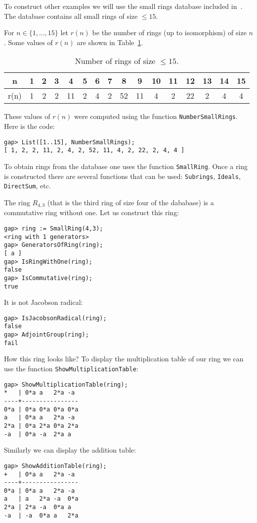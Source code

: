 To construct other examples we will use the small rings database included
in~\GAP.  The database contains all small rings of size $\leq15$.

\begin{example}
	For $n\in\{1,\dots,15\}$ let $r(n)$ be the number of rings (up to
	isomorphism) of size $n$. Some values of $r(n)$ are shown in
	Table~\ref{tab:rings}. 
	\begin{table}[h]
		\caption{Number of rings of size $\leq15$.}
		\label{tab:rings}
		\begin{tabular}{|c|ccccccccccccccc|}
			\hline
			n & 1 & 2 & 3 & 4 & 5 & 6 & 7 & 8 & 9 & 10 & 11 & 12 & 13 & 14 & 15\\
			\hline
			r(n) & 1 & 2 & 2 & 11 & 2 & 4 & 2 & 52 & 11 & 4 & 2 & 22 & 2 & 4 & 4\\
			\hline
		\end{tabular}
	\end{table}

	These values of $r(n)$ were computed using the function
	\lstinline{NumberSmallRings}. Here is the code:
\begin{lstlisting}
gap> List([1..15], NumberSmallRings);
[ 1, 2, 2, 11, 2, 4, 2, 52, 11, 4, 2, 22, 2, 4, 4 ]
\end{lstlisting}
\end{example}

To obtain rings from the database one uses the function \lstinline{SmallRing}.
Once a ring is constructed there are several functions that can be used:
\lstinline{Subrings}, \lstinline{Ideals}, \lstinline{DirectSum}, etc.

\begin{example}
The ring $R_{4,3}$ (that is the third ring of size four of the dababase) is
a commutative ring without one. Let us construct this ring:
\begin{lstlisting}
gap> ring := SmallRing(4,3);
<ring with 1 generators>
gap> GeneratorsOfRing(ring);
[ a ]
gap> IsRingWithOne(ring);
false
gap> IsCommutative(ring);
true
\end{lstlisting}
It is not Jacobson radical:
\begin{lstlisting}
gap> IsJacobsonRadical(ring);
false
gap> AdjointGroup(ring);
fail
\end{lstlisting}
How this ring looks like? 
To display the multiplication table of our ring we can use the function 
\lstinline{ShowMultiplicationTable}: 
\begin{lstlisting}
gap> ShowMultiplicationTable(ring);
*   | 0*a a   2*a -a 
----+----------------
0*a | 0*a 0*a 0*a 0*a
a   | 0*a a   2*a -a 
2*a | 0*a 2*a 0*a 2*a
-a  | 0*a -a  2*a a  
\end{lstlisting}
Similarly we can display the addition table:
\begin{lstlisting}
gap> ShowAdditionTable(ring);
+   | 0*a a   2*a -a 
----+----------------
0*a | 0*a a   2*a -a 
a   | a   2*a -a  0*a
2*a | 2*a -a  0*a a  
-a  | -a  0*a a   2*a
\end{lstlisting}
\end{example}

